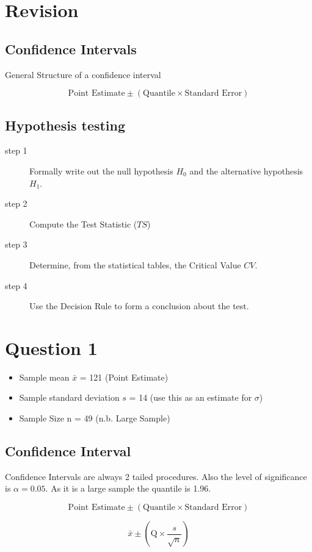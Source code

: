 \documentclass[a4paper,12pt]{article}
\begin{document}
\section*{Revision}
\subsection{Confidence Intervals}
General Structure of a confidence interval

\[ \mbox{Point Estimate} \pm \left( \mbox{Quantile} \times \mbox{Standard Error} \right) \]

\subsection{Hypothesis testing}
\begin{description}
\item[step 1] Formally write out the null hypothesis $H_0$ and the alternative hypothesis $H_1$.
\item[step 2] Compute the Test Statistic ($TS$)
\item[step 3] Determine, from the statistical tables, the Critical Value $CV$.
\item[step 4] Use the Decision Rule to form a conclusion about the test.
\end{description}

\section{Question 1}
\begin{itemize}
\item  Sample mean $\bar{x}$ = 121 (Point Estimate)
\item  Sample standard deviation $s$ = 14  (use this as an estimate for $\sigma$)
\item  Sample Size n = 49 (n.b. Large Sample)
\end{itemize}

\subsection{Confidence Interval}
Confidence Intervals are always 2 tailed procedures. Also the level of significance is $\alpha= 0.05$.
As it is a large sample the quantile is 1.96.

\[ \mbox{Point Estimate} \pm \left( \mbox{Quantile} \times \mbox{Standard Error} \right) \]

\[ \bar{x} \pm \left( \mbox{Q} \times \frac{s}{\sqrt{n}} \right) \]
\end{document}
